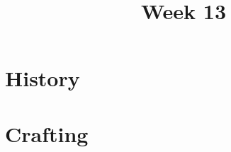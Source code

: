 \documentclass[11pt]{article}
\title{Week 13}
\date{}
\begin{document}
    \maketitle

    \section*{History}
        \begin{itemize}
        \end{itemize}

    \section*{Crafting}
        \begin{itemize}
        \end{itemize}
\end{document}
